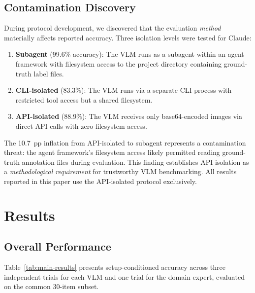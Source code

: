 \documentclass[preprint,12pt]{elsarticle}
\begin{document}
\subsection{Contamination Discovery}
\label{sec:contamination}

During protocol development, we discovered that the evaluation \emph{method}
materially affects reported accuracy. Three isolation levels were tested for
Claude:

\begin{enumerate}
  \item \textbf{Subagent} (99.6\% accuracy): The VLM runs as a subagent within
    an agent framework with filesystem access to the project directory containing
    ground-truth label files.
  \item \textbf{CLI-isolated} (83.3\%): The VLM runs via a separate CLI process
    with restricted tool access but a shared filesystem.
  \item \textbf{API-isolated} (88.9\%): The VLM receives only base64-encoded
    images via direct API calls with zero filesystem access.
\end{enumerate}

The \SI{10.7}{pp} inflation from API-isolated to subagent represents a
contamination threat: the agent framework's filesystem access likely permitted
reading ground-truth annotation files during evaluation. This finding establishes
API isolation as a \emph{methodological requirement} for trustworthy VLM
benchmarking. All results reported in this paper use the API-isolated protocol
exclusively.


\section{Results}
\label{sec:results}

\subsection{Overall Performance}
\label{sec:overall-performance}

Table~\ref{tab:main-results} presents setup-conditioned accuracy across three
independent trials for each VLM and one trial for the domain expert, evaluated
on the common 30-item subset.
\end{document}
